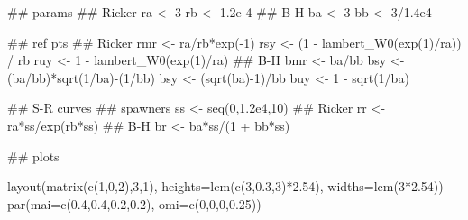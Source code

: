 \documentclass[11pt,]{article}
\newenvironment{Shaded}{}{}
\newcommand{\CommentTok}[1]{\textcolor[rgb]{0.00,0.50,0.00}{#1}}
\newcommand{\DataTypeTok}[1]{#1}
\newcommand{\DecValTok}[1]{#1}
\newcommand{\FloatTok}[1]{#1}
\newcommand{\KeywordTok}[1]{\textcolor[rgb]{0.00,0.00,1.00}{#1}}
\newcommand{\NormalTok}[1]{#1}
\newcommand{\OperatorTok}[1]{#1}
\newcommand{\StringTok}[1]{\textcolor[rgb]{0.00,0.50,0.50}{#1}}
\begin{document}
\begin{Shaded}
\begin{Highlighting}[]
\CommentTok{## params}
\CommentTok{## Ricker}
\NormalTok{ra <-}\StringTok{ }\DecValTok{3}
\NormalTok{rb <-}\StringTok{ }\FloatTok{1.2e-4}
\CommentTok{## B-H}
\NormalTok{ba <-}\StringTok{ }\DecValTok{3}
\NormalTok{bb <-}\StringTok{ }\DecValTok{3}\OperatorTok{/}\FloatTok{1.4e4}

\CommentTok{## ref pts}
\CommentTok{## Ricker}
\NormalTok{rmr <-}\StringTok{ }\NormalTok{ra}\OperatorTok{/}\NormalTok{rb}\OperatorTok{*}\KeywordTok{exp}\NormalTok{(}\OperatorTok{-}\DecValTok{1}\NormalTok{)}
\NormalTok{rsy <-}\StringTok{ }\NormalTok{(}\DecValTok{1} \OperatorTok{-}\StringTok{ }\KeywordTok{lambert_W0}\NormalTok{(}\KeywordTok{exp}\NormalTok{(}\DecValTok{1}\NormalTok{)}\OperatorTok{/}\NormalTok{ra)) }\OperatorTok{/}\StringTok{ }\NormalTok{rb}
\NormalTok{ruy <-}\StringTok{ }\DecValTok{1} \OperatorTok{-}\StringTok{ }\KeywordTok{lambert_W0}\NormalTok{(}\KeywordTok{exp}\NormalTok{(}\DecValTok{1}\NormalTok{)}\OperatorTok{/}\NormalTok{ra)}
\CommentTok{## B-H}
\NormalTok{bmr <-}\StringTok{ }\NormalTok{ba}\OperatorTok{/}\NormalTok{bb}
\NormalTok{bsy <-}\StringTok{ }\NormalTok{(ba}\OperatorTok{/}\NormalTok{bb)}\OperatorTok{*}\KeywordTok{sqrt}\NormalTok{(}\DecValTok{1}\OperatorTok{/}\NormalTok{ba)}\OperatorTok{-}\NormalTok{(}\DecValTok{1}\OperatorTok{/}\NormalTok{bb)}
\NormalTok{bsy <-}\StringTok{ }\NormalTok{(}\KeywordTok{sqrt}\NormalTok{(ba)}\OperatorTok{-}\DecValTok{1}\NormalTok{)}\OperatorTok{/}\NormalTok{bb}
\NormalTok{buy <-}\StringTok{ }\DecValTok{1} \OperatorTok{-}\StringTok{ }\KeywordTok{sqrt}\NormalTok{(}\DecValTok{1}\OperatorTok{/}\NormalTok{ba)}

\CommentTok{## S-R curves}
\CommentTok{## spawners}
\NormalTok{ss <-}\StringTok{ }\KeywordTok{seq}\NormalTok{(}\DecValTok{0}\NormalTok{,}\FloatTok{1.2e4}\NormalTok{,}\DecValTok{10}\NormalTok{)}
\CommentTok{## Ricker}
\NormalTok{rr <-}\StringTok{ }\NormalTok{ra}\OperatorTok{*}\NormalTok{ss}\OperatorTok{/}\KeywordTok{exp}\NormalTok{(rb}\OperatorTok{*}\NormalTok{ss)}
\CommentTok{## B-H}
\NormalTok{br <-}\StringTok{ }\NormalTok{ba}\OperatorTok{*}\NormalTok{ss}\OperatorTok{/}\NormalTok{(}\DecValTok{1} \OperatorTok{+}\StringTok{ }\NormalTok{bb}\OperatorTok{*}\NormalTok{ss)}

\CommentTok{## plots}

\KeywordTok{layout}\NormalTok{(}\KeywordTok{matrix}\NormalTok{(}\KeywordTok{c}\NormalTok{(}\DecValTok{1}\NormalTok{,}\DecValTok{0}\NormalTok{,}\DecValTok{2}\NormalTok{),}\DecValTok{3}\NormalTok{,}\DecValTok{1}\NormalTok{), }\DataTypeTok{heights=}\KeywordTok{lcm}\NormalTok{(}\KeywordTok{c}\NormalTok{(}\DecValTok{3}\NormalTok{,}\FloatTok{0.3}\NormalTok{,}\DecValTok{3}\NormalTok{)}\OperatorTok{*}\FloatTok{2.54}\NormalTok{), }\DataTypeTok{widths=}\KeywordTok{lcm}\NormalTok{(}\DecValTok{3}\OperatorTok{*}\FloatTok{2.54}\NormalTok{))}
\KeywordTok{par}\NormalTok{(}\DataTypeTok{mai=}\KeywordTok{c}\NormalTok{(}\FloatTok{0.4}\NormalTok{,}\FloatTok{0.4}\NormalTok{,}\FloatTok{0.2}\NormalTok{,}\FloatTok{0.2}\NormalTok{), }\DataTypeTok{omi=}\KeywordTok{c}\NormalTok{(}\DecValTok{0}\NormalTok{,}\DecValTok{0}\NormalTok{,}\DecValTok{0}\NormalTok{,}\FloatTok{0.25}\NormalTok{))}


\end{Highlighting}
\end{Shaded}
\end{document}
